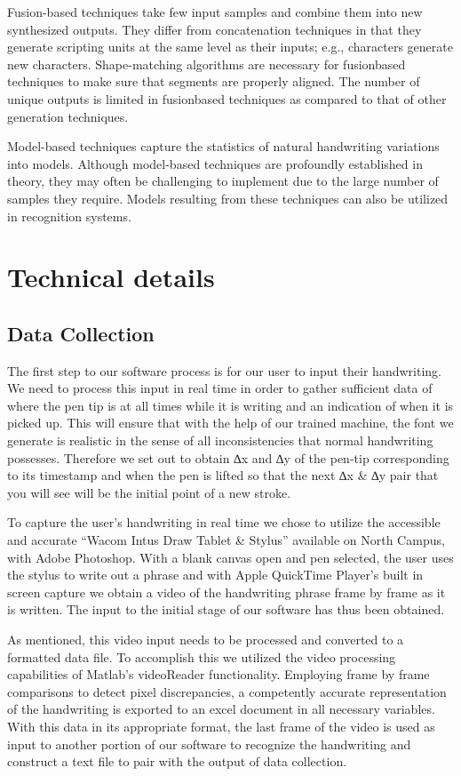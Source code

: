 \documentclass{article} %
\begin{document}
Fusion-based techniques take few input samples and combine
them into new synthesized outputs. They differ from concatenation
techniques in that they generate scripting units at the
same level as their inputs; e.g., characters generate new characters.
Shape-matching algorithms are necessary for fusionbased
techniques to make sure that segments are properly
aligned. The number of unique outputs is limited in fusionbased
techniques as compared to that of other generation
techniques.

Model-based techniques capture the statistics of natural
handwriting variations into models. Although model-based
techniques are profoundly established in theory, they may
often be challenging to implement due to the large number
of samples they require. Models resulting from
these techniques can also be utilized in recognition systems. 

\section{Technical details}
\subsection{Data Collection}

The first step to our software process is for our user to input their handwriting. We need to process this input in real time in order to gather sufficient data of where the pen tip is at all times while it is writing and an indication of when it is picked up. This will ensure that with the help of our trained machine, the font we generate is realistic in the sense of all inconsistencies that normal handwriting possesses. Therefore we set out to obtain ∆x and ∆y of the pen-tip corresponding to its timestamp and when the pen is lifted so that the next ∆x \& ∆y pair that you will see will be the initial point of a new stroke. 

To capture the user’s handwriting in real time we chose to utilize the accessible and accurate “Wacom Intus Draw Tablet \& Stylus” available on North Campus, with Adobe Photoshop. With a blank canvas open and pen selected, the user uses the stylus to write out a phrase and with Apple QuickTime Player’s built in screen capture we obtain a video of the handwriting phrase frame by frame as it is written. The input to the initial stage of our software has thus been obtained. 

As mentioned, this video input needs to be processed and converted to a formatted data file. To accomplish this we utilized the video processing capabilities of Matlab’s videoReader functionality. Employing frame by frame comparisons to detect pixel discrepancies, a competently accurate representation of the handwriting is exported to an excel document in all necessary variables. With this data in its appropriate format, the last frame of the video is used as input to another portion of our software to recognize the handwriting and construct a text file to pair with the output of data collection.
\end{document}
